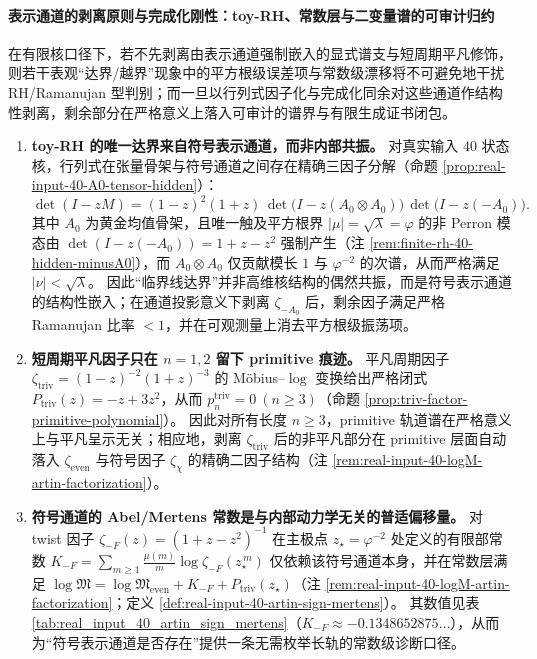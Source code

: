 \paragraph{表示通道的剥离原则与完成化刚性：toy-RH、常数层与二变量谱的可审计归约}
在有限核口径下，若不先剥离由表示通道强制嵌入的显式谱支与短周期平凡修饰，则若干表观“达界/越界”现象中的平方根级误差项与常数级漂移将不可避免地干扰 RH/Ramanujan 型判别；而一旦以行列式因子化与完成化同余对这些通道作结构性剥离，剩余部分在严格意义上落入可审计的谱界与有限生成证书闭包。
\begin{enumerate}
  \item \textbf{toy-RH 的唯一达界来自符号表示通道，而非内部共振。}
  对真实输入 \(40\) 状态核，行列式在张量骨架与符号通道之间存在精确三因子分解（命题 \ref{prop:real-input-40-A0-tensor-hidden}）：
  \[
  \det(I-zM)=(1-z)^2(1+z)\,\det\!\bigl(I-z(A_0\otimes A_0)\bigr)\,\det\!\bigl(I-z(-A_0)\bigr).
  \]
  其中 \(A_0\) 为黄金均值骨架，且唯一触及平方根界 \(|\mu|=\sqrt{\lambda}=\varphi\) 的非 Perron 模态由 \(\det(I-z(-A_0))=1+z-z^2\) 强制产生（注 \ref{rem:finite-rh-40-hidden-minusA0}），而 \(A_0\otimes A_0\) 仅贡献模长 \(1\) 与 \(\varphi^{-2}\) 的次谱，从而严格满足 \(|\nu|<\sqrt{\lambda}\)。
  因此“临界线达界”并非高维核结构的偶然共振，而是符号表示通道的结构性嵌入；在通道投影意义下剥离 \(\zeta_{-A_0}\) 后，剩余因子满足严格 Ramanujan 比率 \(<1\)，并在可观测量上消去平方根级振荡项。

  \item \textbf{短周期平凡因子只在 \texorpdfstring{$n=1,2$}{n=1,2} 留下 primitive 痕迹。}
  平凡周期因子 \(\zeta_{\mathrm{triv}}=(1-z)^{-2}(1+z)^{-3}\) 的 Möbius--\(\log\) 变换给出严格闭式
  \(P_{\mathrm{triv}}(z)=-z+3z^2\)，从而 \(p^{\mathrm{triv}}_n=0\ (n\ge 3)\)（命题 \ref{prop:triv-factor-primitive-polynomial}）。
  因此对所有长度 \(n\ge 3\)，primitive 轨道谱在严格意义上与平凡呈示无关；相应地，剥离 \(\zeta_{\mathrm{triv}}\) 后的非平凡部分在 primitive 层面自动落入 \(\zeta_{\mathrm{even}}\) 与符号因子 \(\zeta_{\chi}\) 的精确二因子结构（注 \ref{rem:real-input-40-logM-artin-factorization}）。

  \item \textbf{符号通道的 Abel/Mertens 常数是与内部动力学无关的普适偏移量。}
  对 twist 因子 \(\zeta_{-F}(z)=(1+z-z^2)^{-1}\) 在主极点 \(z_\star=\varphi^{-2}\) 处定义的有限部常数
  \(K_{-F}=\sum_{m\ge 1}\frac{\mu(m)}{m}\log\zeta_{-F}(z_\star^{\,m})\)
  仅依赖该符号通道本身，并在常数层满足
  \(\log\mathfrak{M}=\log\mathfrak{M}_{\mathrm{even}}+K_{-F}+P_{\mathrm{triv}}(z_\star)\)（注 \ref{rem:real-input-40-logM-artin-factorization}；定义 \ref{def:real-input-40-artin-sign-mertens}）。
  其数值见表 \ref{tab:real_input_40_artin_sign_mertens}（\(K_{-F}\approx -0.1348652875\ldots\)），从而为“符号表示通道是否存在”提供一条无需枚举长轨的常数级诊断口径。


\end{enumerate}
